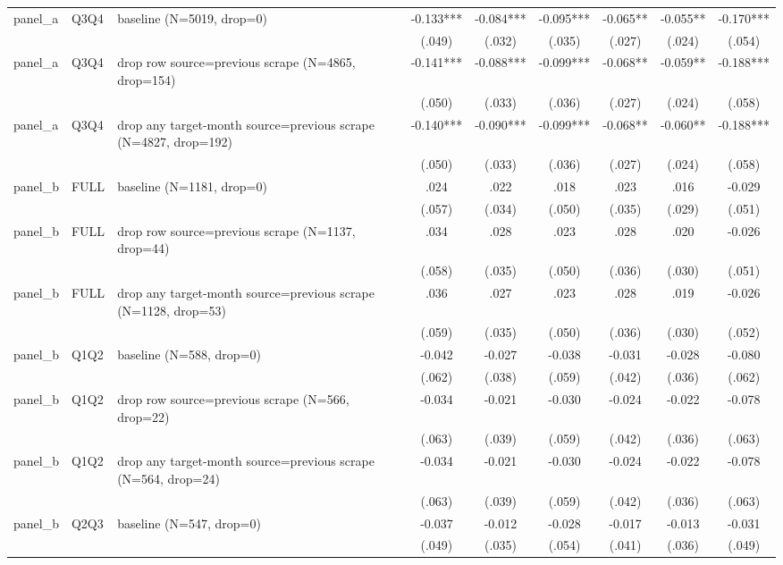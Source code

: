 \begin{tabular}{lllcccccc}
\\
panel\_a & Q3Q4 & baseline (N=5019, drop=0) & -0.133*** & -0.084*** & -0.095*** & -0.065** & -0.055** & -0.170***
\\
 &  &  & (.049) & (.032) & (.035) & (.027) & (.024) & (.054)
\\
panel\_a & Q3Q4 & drop row source=previous scrape (N=4865, drop=154) & -0.141*** & -0.088*** & -0.099*** & -0.068** & -0.059** & -0.188***
\\
 &  &  & (.050) & (.033) & (.036) & (.027) & (.024) & (.058)
\\
panel\_a & Q3Q4 & drop any target-month source=previous scrape (N=4827, drop=192) & -0.140*** & -0.090*** & -0.099*** & -0.068** & -0.060** & -0.188***
\\
 &  &  & (.050) & (.033) & (.036) & (.027) & (.024) & (.058)
\\
panel\_b & FULL & baseline (N=1181, drop=0) & .024 & .022 & .018 & .023 & .016 & -0.029
\\
 &  &  & (.057) & (.034) & (.050) & (.035) & (.029) & (.051)
\\
panel\_b & FULL & drop row source=previous scrape (N=1137, drop=44) & .034 & .028 & .023 & .028 & .020 & -0.026
\\
 &  &  & (.058) & (.035) & (.050) & (.036) & (.030) & (.051)
\\
panel\_b & FULL & drop any target-month source=previous scrape (N=1128, drop=53) & .036 & .027 & .023 & .028 & .019 & -0.026
\\
 &  &  & (.059) & (.035) & (.050) & (.036) & (.030) & (.052)
\\
panel\_b & Q1Q2 & baseline (N=588, drop=0) & -0.042 & -0.027 & -0.038 & -0.031 & -0.028 & -0.080
\\
 &  &  & (.062) & (.038) & (.059) & (.042) & (.036) & (.062)
\\
panel\_b & Q1Q2 & drop row source=previous scrape (N=566, drop=22) & -0.034 & -0.021 & -0.030 & -0.024 & -0.022 & -0.078
\\
 &  &  & (.063) & (.039) & (.059) & (.042) & (.036) & (.063)
\\
panel\_b & Q1Q2 & drop any target-month source=previous scrape (N=564, drop=24) & -0.034 & -0.021 & -0.030 & -0.024 & -0.022 & -0.078
\\
 &  &  & (.063) & (.039) & (.059) & (.042) & (.036) & (.063)
\\
panel\_b & Q2Q3 & baseline (N=547, drop=0) & -0.037 & -0.012 & -0.028 & -0.017 & -0.013 & -0.031
\\
 &  &  & (.049) & (.035) & (.054) & (.041) & (.036) & (.049)

\end{tabular}

